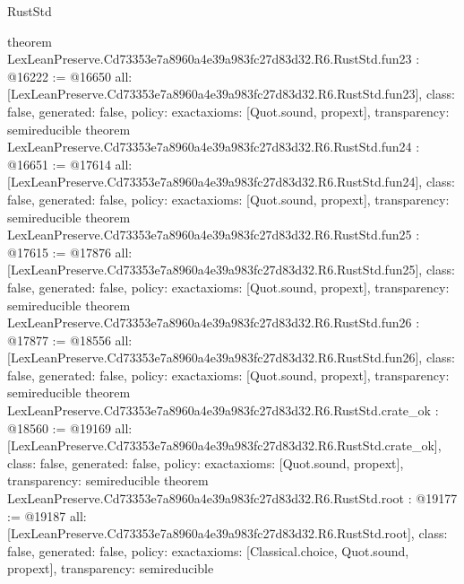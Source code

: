 \begin{lexlean}{RustStd}
\begin{coremodule}
{}
theorem LexLeanPreserve.Cd73353e7a8960a4e39a983fc27d83d32.R6.RustStd.fun23 : @16222 := @16650 {
  all: [LexLeanPreserve.Cd73353e7a8960a4e39a983fc27d83d32.R6.RustStd.fun23],
  class: false,
  generated: false,
  policy: exact{axioms: [Quot.sound, propext]},
  transparency: semireducible
}
theorem LexLeanPreserve.Cd73353e7a8960a4e39a983fc27d83d32.R6.RustStd.fun24 : @16651 := @17614 {
  all: [LexLeanPreserve.Cd73353e7a8960a4e39a983fc27d83d32.R6.RustStd.fun24],
  class: false,
  generated: false,
  policy: exact{axioms: [Quot.sound, propext]},
  transparency: semireducible
}
theorem LexLeanPreserve.Cd73353e7a8960a4e39a983fc27d83d32.R6.RustStd.fun25 : @17615 := @17876 {
  all: [LexLeanPreserve.Cd73353e7a8960a4e39a983fc27d83d32.R6.RustStd.fun25],
  class: false,
  generated: false,
  policy: exact{axioms: [Quot.sound, propext]},
  transparency: semireducible
}
theorem LexLeanPreserve.Cd73353e7a8960a4e39a983fc27d83d32.R6.RustStd.fun26 : @17877 := @18556 {
  all: [LexLeanPreserve.Cd73353e7a8960a4e39a983fc27d83d32.R6.RustStd.fun26],
  class: false,
  generated: false,
  policy: exact{axioms: [Quot.sound, propext]},
  transparency: semireducible
}
theorem LexLeanPreserve.Cd73353e7a8960a4e39a983fc27d83d32.R6.RustStd.crate_ok : @18560 := @19169 {
  all: [LexLeanPreserve.Cd73353e7a8960a4e39a983fc27d83d32.R6.RustStd.crate_ok],
  class: false,
  generated: false,
  policy: exact{axioms: [Quot.sound, propext]},
  transparency: semireducible
}
theorem LexLeanPreserve.Cd73353e7a8960a4e39a983fc27d83d32.R6.RustStd.root : @19177 := @19187 {
  all: [LexLeanPreserve.Cd73353e7a8960a4e39a983fc27d83d32.R6.RustStd.root],
  class: false,
  generated: false,
  policy: exact{axioms: [Classical.choice, Quot.sound, propext]},
  transparency: semireducible
}


\end{coremodule}
\end{lexlean}
